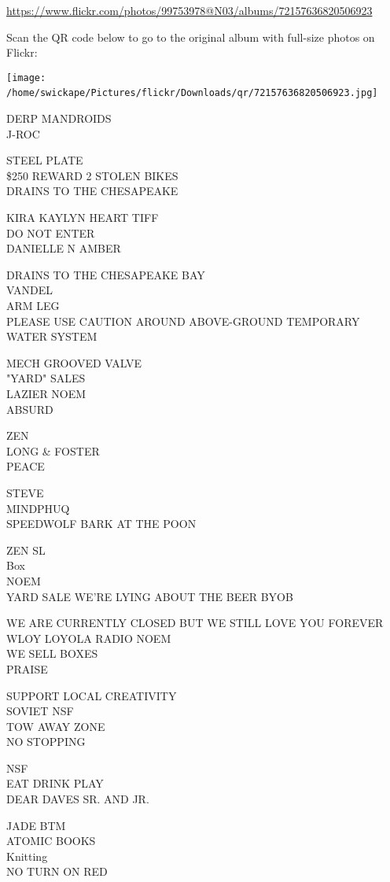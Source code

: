 \documentclass[10pt,letterpaper]{article}
\begin{document}
\url{https://www.flickr.com/photos/99753978@N03/albums/72157636820506923}

Scan the QR code below to go to the original album with full-size photos on Flickr:

\texttt{[image: /home/swickape/Pictures/flickr/Downloads/qr/72157636820506923.jpg]}
\

DERP MANDROIDS\\
J{-}ROC

STEEL PLATE\\
\$250 REWARD 2 STOLEN BIKES\\
DRAINS TO THE CHESAPEAKE

KIRA KAYLYN HEART TIFF\\
DO NOT ENTER\\
DANIELLE N AMBER

DRAINS TO THE CHESAPEAKE BAY\\
VANDEL\\
ARM LEG\\
PLEASE USE CAUTION AROUND ABOVE{-}GROUND TEMPORARY WATER SYSTEM

MECH GROOVED VALVE\\
"YARD" SALES\\
LAZIER NOEM\\
ABSURD

ZEN\\
LONG \& FOSTER\\
PEACE

STEVE\\
MINDPHUQ\\
SPEEDWOLF BARK AT THE POON

ZEN SL\\
Box\\
NOEM\\
YARD SALE WE'RE LYING ABOUT THE BEER BYOB

WE ARE CURRENTLY CLOSED BUT WE STILL LOVE YOU FOREVER\\
WLOY LOYOLA RADIO NOEM\\
WE SELL BOXES\\
PRAISE

SUPPORT LOCAL CREATIVITY\\
SOVIET NSF\\
TOW AWAY ZONE\\
NO STOPPING

NSF\\
EAT DRINK PLAY\\
DEAR DAVES SR. AND JR.

JADE BTM\\
ATOMIC BOOKS\\
Knitting\\
NO TURN ON RED
\end{document}
